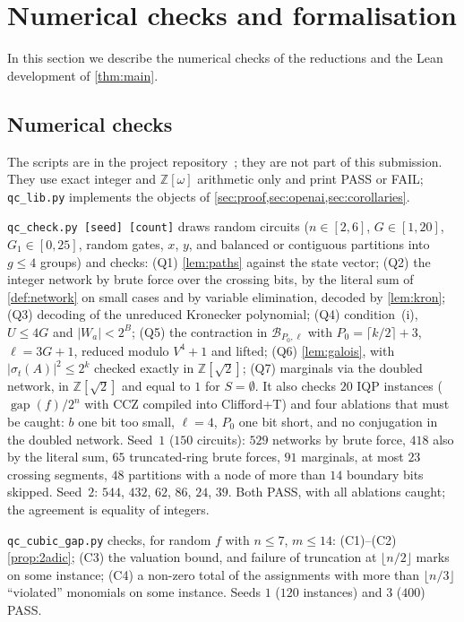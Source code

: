 \documentclass[10pt]{amsart}
\theoremstyle{plain}
\theoremstyle{definition}
\theoremstyle{remark}
\numberwithin{equation}{section}
\newcommand{\Z}{\mathbb{Z}}
\newcommand{\Zw}{\Z[\omega]}
\newcommand{\gap}{\operatorname{gap}}
\newcommand{\cB}{\mathcal{B}}
\begin{document}
\section{Numerical checks and formalisation}\label{sec:verification}

In this section we describe the numerical checks of the reductions and the Lean development of
\cref{thm:main}.

\subsection{Numerical checks}
The scripts are  in the project repository~\cite{TulsyanRepo26};
they are not part of this submission. They use exact integer and
$\Zw$ arithmetic only and print PASS or FAIL; \texttt{qc\_lib.py} implements the objects of
\cref{sec:proof,sec:openai,sec:corollaries}.

\texttt{qc\_check.py [seed] [count]} draws random circuits ($n\in[2,6]$, $G\in[1,20]$,
$G_1\in[0,25]$, random gates, $x$, $y$, and balanced or contiguous partitions into $g\le4$ groups)
and checks: (Q1) \cref{lem:paths} against the state vector; (Q2) the integer network by brute
force over the crossing bits, by the literal sum of \cref{def:network} on small cases and by
variable elimination, decoded by \cref{lem:kron}; (Q3) decoding of the unreduced Kronecker
polynomial; (Q4) condition~(i), $U\le4G$ and $|W_a|<2^B$; (Q5) the contraction in
$\cB_{P_0,\ell}$ with $P_0=\lceil k/2\rceil+3$, $\ell=3G+1$, reduced modulo $V^4+1$ and lifted;
(Q6) \cref{lem:galois}, with $|\sigma_t(A)|^2\le2^k$ checked exactly in $\Z[\sqrt2]$; (Q7) marginals
via the doubled network, in $\Z[\sqrt2]$ and equal to $1$ for $S=\emptyset$. It also checks $20$
IQP instances ($\gap(f)/2^n$ with $\mathrm{CCZ}$ compiled into Clifford+T) and four ablations that
must be caught: $b$ one bit too small, $\ell=4$, $P_0$ one bit short, and no conjugation in the
doubled network. Seed~$1$ ($150$ circuits): $529$ networks by brute force, $418$ also by the literal
sum, $65$ truncated-ring brute forces, $91$ marginals, at most $23$ crossing segments, $48$
partitions with a node of more than $14$ boundary bits skipped. Seed~$2$: $544$, $432$, $62$, $86$,
$24$, $39$. Both PASS, with all ablations caught; the agreement is equality of integers.

\texttt{qc\_cubic\_gap.py} checks, for random $f$ with $n\le7$, $m\le14$: (C1)--(C2)
\cref{prop:2adic}; (C3) the valuation bound, and failure of truncation at $\lfloor n/2\rfloor$ marks
on some instance; (C4) a non-zero total of the assignments with more than $\lfloor n/3\rfloor$
``violated'' monomials on some instance. Seeds $1$ ($120$ instances) and $3$ ($400$) PASS.
\end{document}
